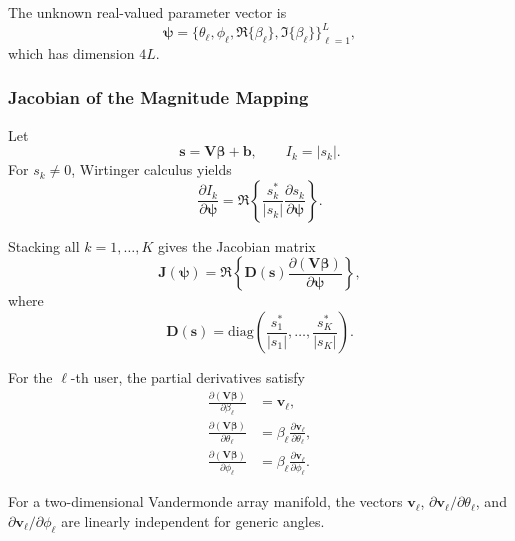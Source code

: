 \documentclass[journal]{IEEEtran}
\begin{document}
The unknown real-valued parameter vector is
%
\begin{equation}
\boldsymbol\psi
=
\{
\theta_\ell,\phi_\ell,
\Re\{\beta_\ell\},\Im\{\beta_\ell\}
\}_{\ell=1}^{L},
\end{equation}
%
which has dimension $4L$.

\subsubsection{Jacobian of the Magnitude Mapping}

Let
%
\begin{equation}
\mathbf s
=
\mathbf V\boldsymbol\beta + \mathbf b,
\qquad
I_k = |s_k|.
\end{equation}
%
For $s_k\neq 0$, Wirtinger calculus yields
%
\begin{equation}
\frac{\partial I_k}{\partial \boldsymbol\psi}
=
\Re\!\left\{
\frac{s_k^{*}}{|s_k|}
\frac{\partial s_k}{\partial \boldsymbol\psi}
\right\}.
\end{equation}

Stacking all $k=1,\ldots,K$ gives the Jacobian matrix
%
\begin{equation}
\mathbf J(\boldsymbol\psi)
=
\Re\!\left\{
\mathbf D(\mathbf s)
\frac{\partial (\mathbf V\boldsymbol\beta)}{\partial\boldsymbol\psi}
\right\},
\label{eq:Jacobian_def}
\end{equation}
%
where
%
\begin{equation}
\mathbf D(\mathbf s)
=
\mathrm{diag}
\!\left(
\frac{s_1^{*}}{|s_1|},\ldots,\frac{s_K^{*}}{|s_K|}
\right).
\end{equation}

For the $\ell$-th user, the partial derivatives satisfy
%
\begin{align}
\frac{\partial (\mathbf V\boldsymbol\beta)}{\partial \beta_\ell}
&= \mathbf v_\ell,
\\
\frac{\partial (\mathbf V\boldsymbol\beta)}{\partial \theta_\ell}
&= \beta_\ell
\frac{\partial \mathbf v_\ell}{\partial \theta_\ell},
\\
\frac{\partial (\mathbf V\boldsymbol\beta)}{\partial \phi_\ell}
&= \beta_\ell
\frac{\partial \mathbf v_\ell}{\partial \phi_\ell}.
\end{align}

For a two-dimensional Vandermonde array manifold,
the vectors
$\mathbf v_\ell$,
$\partial \mathbf v_\ell/\partial\theta_\ell$,
and
$\partial \mathbf v_\ell/\partial\phi_\ell$
are linearly independent for generic angles.
\end{document}

